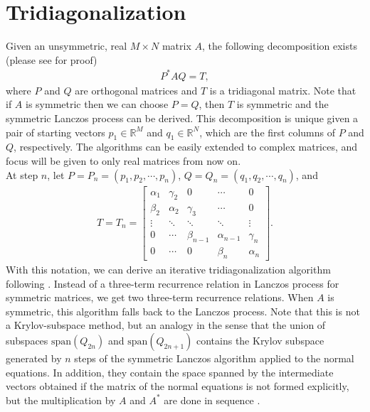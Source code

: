 \documentclass[10pt,letterpaper]{article}
\def\R{\mathbb{R}}
\def\alfa{\alpha}
\def\gama{\gamma}
\def\Span{\text{span}}
\begin{document}
\section{Tridiagonalization}
Given an unsymmetric, real $M \times N$ matrix $A$, the following 
decomposition exists (please see \cite{saunders:1988} for proof)
\begin{align}
    P^* A Q = T, \label{eq:PAQT}
\end{align}
where $P$ and $Q$ are orthogonal matrices and $T$ is a tridiagonal 
matrix. Note that if $A$ is symmetric then we can choose $P =Q$, then
$T$ is symmetric and the symmetric Lanczos process can be derived. This
decomposition is unique given a pair of starting vectors 
$p_1 \in \R^M$ and $q_1 \in \R^N$, which are the first columns of $P$
and $Q$, respectively. 
The algorithms can be easily extended to complex matrices, and focus will 
be given to only real matrices from now on. \\

At step $n$, let $P = P_n = (p_1, p_2, \cdots, p_n)$, 
$Q = Q_n = (q_1, q_2, \cdots, q_n)$, and 
\begin{align} 
    T = T_n = 
    \begin{bmatrix}
            \alfa_1 & \gama_2 & 0       & \cdots & 0      \\
            \beta_2 & \alfa_2 & \gama_3 & \cdots & 0      \\
            \vdots  & \ddots  & \ddots  & \ddots & \vdots \\
            0       & \cdots  & \beta_{n-1} & \alfa_{n-1} & \gama_n \\
            0       & \cdots  & 0           & \beta_n     & \alfa_n
    \end{bmatrix}. 
\end{align}
With this notation, we can derive an iterative tridiagonalization algorithm 
 following \cite{saunders:1988}. Instead of a three-term
recurrence relation in Lanczos process for symmetric matrices, we get two
three-term recurrence relations. When $A$ is symmetric, this algorithm 
falls back to the Lanczos process. Note that this is not a Krylov-subspace
method, but an analogy in the sense that the union of subspaces 
$\Span(Q_{2n})$ and $\Span(Q_{2n+1})$ contains the Krylov subspace generated
by $n$ steps of the symmetric Lanczos algorithm applied to the normal 
equations. In addition, they contain the space spanned by the intermediate 
vectors obtained if the matrix of the normal equations is not formed 
explicitly, but the multiplication by $A$ and $A^*$ are done in sequence 
\cite{saunders:1988}.
\end{document}
